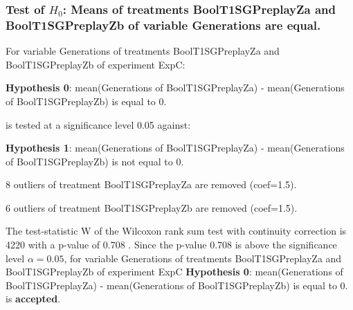 \begin{frame}[t]
 \frametitle{Test of $H_{0}$: Means of treatments BoolT1SGPreplayZa and BoolT1SGPreplayZb of variable Generations are equal. }
 \scriptsize
 For variable Generations of treatments BoolT1SGPreplayZa and BoolT1SGPreplayZb of experiment ExpC:

\vspace{1mm}
{\bf Hypothesis 0}: mean(Generations of BoolT1SGPreplayZa) - mean(Generations of BoolT1SGPreplayZb) is equal to 0.


 \begin{center} is tested at a significance level 0.05 against: \end{center}

{\bf Hypothesis 1}: mean(Generations of BoolT1SGPreplayZa) - mean(Generations of BoolT1SGPreplayZb) is not equal to 0.
\vspace{1mm}
\vspace{1mm}

 8 outliers of treatment BoolT1SGPreplayZa are removed (coef=1.5).

 6 outliers of treatment BoolT1SGPreplayZb are removed (coef=1.5).
\vspace{1mm}
 
 The test-statistic W of the Wilcoxon rank sum test with continuity correction is 4220 with a p-value of 0.708 .
 Since the p-value 0.708 is above the significance level $\alpha= 0.05 $,
 for variable Generations of treatments BoolT1SGPreplayZa and BoolT1SGPreplayZb of experiment ExpC 
 {\bf Hypothesis 0}: mean(Generations of BoolT1SGPreplayZa) - mean(Generations of BoolT1SGPreplayZb) is equal to 0.
is {\bf accepted}.

 \end{frame}
